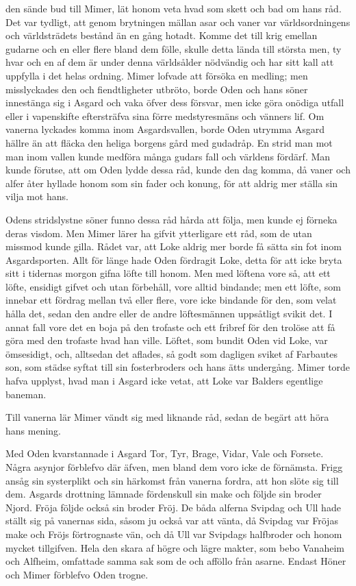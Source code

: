 \dropcapO den sände bud till Mimer, lät honom veta hvad som skett och bad om hans
råd. Det var tydligt, att genom brytningen mällan asar och vaner var
världsordningens och världsträdets bestånd än en gång hotadt. Komme det
till krig emellan gudarne och en eller flere bland dem fölle, skulle
detta lända till största men, ty hvar och en af dem är under denna
världsålder nödvändig och har sitt kall att
uppfylla i det helas ordning. Mimer lofvade att försöka en medling; men
misslyckades den och fiendtligheter utbröto, borde Oden och hans söner
innestänga sig i Asgard och vaka öfver dess försvar, men icke göra
onödiga utfall eller i vapenskifte eftersträfva sina förre medstyresmäns
och vänners lif. Om vanerna lyckades komma inom Asgardsvallen, borde
Oden utrymma Asgard hällre än att fläcka den heliga borgens gård med
gudadråp. En strid man mot man inom vallen kunde medföra många gudars
fall och världens fördärf. Man kunde förutse, att om Oden lydde dessa
råd, kunde den dag komma, då vaner och alfer åter hyllade honom som sin
fader och konung, för att aldrig mer ställa sin vilja mot hans.

Odens stridslystne söner funno dessa råd hårda att följa, men kunde ej
förneka deras visdom. Men Mimer lärer ha gifvit ytterligare ett råd, som
de utan missmod kunde gilla. Rådet var, att Loke aldrig mer borde få
sätta sin fot inom Asgardsporten. Allt för länge hade Oden fördragit
Loke, detta för att icke bryta sitt i tidernas morgon gifna löfte till
honom. Men med löftena vore så, att ett löfte, ensidigt gifvet och utan
förbehåll, vore alltid bindande; men ett löfte, som innebar ett fördrag
mellan två eller flere, vore icke bindande för den, som velat hålla det,
sedan den andre eller de andre löftesmännen uppsåtligt svikit det. I
annat fall vore det en boja på den trofaste och ett fribref för den
trolöse att få göra med den trofaste hvad han ville. Löftet, som bundit
Oden vid Loke, var ömsesidigt, och, alltsedan det aflades, så godt som
dagligen sviket af Farbautes son, som städse syftat till sin
fosterbroders och hans ätts undergång. Mimer torde hafva upplyst, hvad
man i Asgard icke vetat, att Loke var Balders egentlige baneman.

Till vanerna lär Mimer vändt sig med liknande råd, sedan de begärt att
höra hans mening.

Med Oden kvarstannade i Asgard Tor, Tyr, Brage, Vidar, Vale och Forsete.
Några asynjor förblefvo där äfven, men bland dem voro icke de förnämsta.
Frigg ansåg sin systerplikt och sin härkomst från vanerna fordra, att
hon slöte sig
till dem. Asgards drottning lämnade fördenskull sin make och följde sin
broder Njord. Fröja följde också sin broder Fröj. De båda alferna
Svipdag och Ull hade ställt sig på vanernas sida, såsom ju också var att
vänta, då Svipdag var Fröjas make och Fröjs förtrognaste vän, och då Ull
var Svipdags halfbroder och honom mycket tillgifven. Hela den skara af
högre och lägre makter, som bebo Vanaheim och Alfheim, omfattade samma
sak som de och afföllo från asarne. Endast Höner och Mimer förblefvo
Oden trogne.

